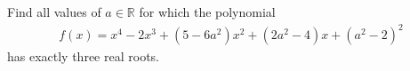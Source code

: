 Find all values of $a \in \mathbb{R}$ for which the polynomial
\begin{align*} f(x)=x^4-2x^3 + \left(5-6a^2 \right)x^2 + \left(2a^2-4 \right)x + \left(a^2 -2 \right)^2 \end{align*}has exactly three real roots.